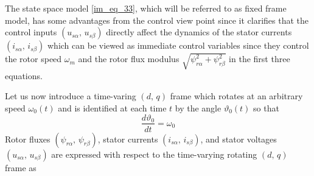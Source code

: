 \documentclass[11pt,a4paper,oneside]{book}
\numberwithin{equation}{section}
\theoremstyle{it}
\theoremstyle{definition}
\begin{document}
The state space model \ref{im_eq_33}, which will be referred to as fixed frame 
model, has some advantages from the control view point since it clarifies that 
the control inputs $\left(u_{s\alpha},\, u_{s\beta}\right)$ directly affect the 
dynamics of the stator currents $\left(i_{s\alpha},\, i_{s\beta}\right)$ which 
can be viewed as immediate control variables since they control the rotor speed 
$\omega_m$ and the rotor flux modulus $\sqrt{\psi_{r\alpha}^2 + 
	\psi_{r\beta}^2}$ in the first three equations.

Let us now introduce a time-varing $\left(d,\,q\right)$ frame which rotates at 
an arbitrary speed $\omega_0(t)$ and is identified at each time $t$ by the 
angle $\vartheta_0(t)$ so that
\begin{equation}\label{im_eq_39}
	\frac{d\vartheta_0}{dt} = \omega_0
\end{equation}
Rotor fluxes $(\psi_{r\alpha},\,\psi_{r\beta})$, stator currents 
$(i_{s\alpha},\,i_{s\beta})$, and stator voltages $(u_{s\alpha},\,u_{s\beta})$ 
are expressed with respect to the time-varying rotating $(d,\,q)$ frame as 
\end{document}
